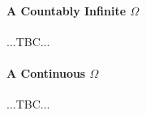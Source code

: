 \paragraph{A Countably Infinite $\Omega$} ...TBC...

\paragraph{A Continuous $\Omega$} ...TBC...












